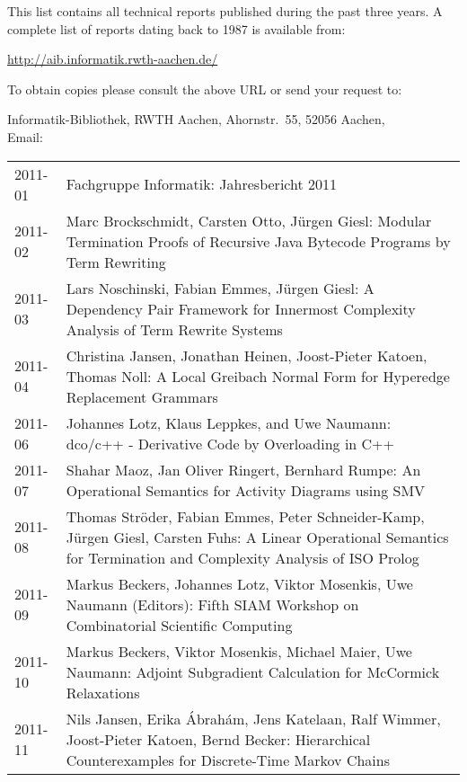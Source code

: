 \documentclass[color]{aib}
\begin{document}
{\bbb This list contains all technical reports published
  during the past three years.
  A complete list of reports dating back to 1987 is available from:
\begin{center}
  \url{http://aib.informatik.rwth-aachen.de/}
\end{center}
  To obtain copies please consult the above URL or send your request
  to:
\begin{center}
  Informatik-Bibliothek, RWTH Aachen, Ahornstr.~55, 52056 Aachen,\\
  Email: 
\end{center}}\bigskip


\begin{longtable}{lp{11cm}}


2011-01  &Fachgruppe Informatik:      Jahresbericht 2011\\
2011-02 & Marc Brockschmidt, Carsten Otto, J\"{u}rgen Giesl:         Modular Termination Proofs of Recursive Java Bytecode Programs by Term Rewriting\\
2011-03 & Lars Noschinski, Fabian Emmes, J\"{u}rgen Giesl:         A Dependency Pair Framework for Innermost Complexity Analysis of Term Rewrite Systems\\
2011-04 & Christina Jansen, Jonathan Heinen, Joost-Pieter Katoen, Thomas Noll:         A Local Greibach Normal Form for Hyperedge Replacement Grammars\\
2011-06 & Johannes Lotz, Klaus Leppkes, and Uwe Naumann:         dco/c++ - Derivative Code by Overloading in C++\\
2011-07 & Shahar Maoz, Jan Oliver Ringert, Bernhard Rumpe:         An Operational Semantics for Activity Diagrams using SMV\\
2011-08 & Thomas Str\"{o}der, Fabian Emmes, Peter Schneider-Kamp, J\"{u}rgen Giesl, Carsten Fuhs:         A Linear Operational Semantics for Termination and Complexity Analysis of ISO Prolog\\
2011-09 & Markus Beckers, Johannes Lotz, Viktor Mosenkis, Uwe Naumann (Editors):         Fifth SIAM Workshop on Combinatorial Scientific Computing\\
2011-10 & Markus Beckers, Viktor Mosenkis, Michael Maier, Uwe Naumann:         Adjoint Subgradient Calculation for McCormick Relaxations\\
2011-11 & Nils Jansen, Erika \'{A}brah\'{a}m, Jens Katelaan, Ralf Wimmer, Joost-Pieter Katoen, Bernd Becker:         Hierarchical Counterexamples for Discrete-Time Markov Chains\\

\end{longtable}
\end{document}
